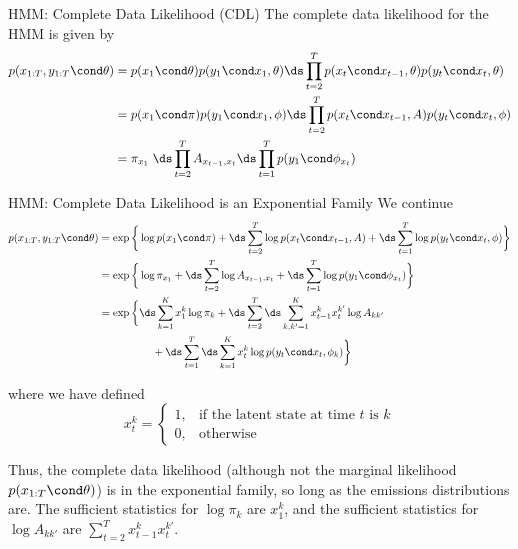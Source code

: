 \documentclass[10pt]{beamer}
\begin{document}
{\begin{frame}{HMM: Complete Data Likelihood (CDL) }
The complete data likelihood for the HMM is given by 
\begin{align}
 p(x_{1:T}, y_{1:T} \cond \theta) &=  p(x_1 \cond \theta)  p(y_1 \cond x_1, \theta) \ds\prod_{t=2}^T p(x_t \cond x_{t-1}, \theta) p(y_t \cond x_t, \theta) \nonumber \\
 &=  p(x_1 \cond \pi) p(y_1 \cond x_1, \phi) \ds\prod_{t=2}^T p(x_t \cond x_{t-1}, A) p(y_t \cond x_t, \phi)   \nonumber \\
 &= \pi_{x_1}  \; \ds\prod_{t=2}^T A_{x_{t-1}, x_t} \ds\prod_{t=1}^T p(y_1 \cond \phi_{x_t}) \label{eqn:hmm_cdl_compact}
 \end{align}
\end{frame}

\begin{frame}{HMM: Complete Data Likelihood is an Exponential Family}
We continue 
\small
\begin{align}
p(x_{1:T}, y_{1:T} \cond \theta) &=  \exp\bigg \{ \log p(x_1 \cond \pi) + \ds\sum_{t=2}^T \log p(x_t \cond x_{t-1}, A) +  \ds\sum_{t=1}^T \log p(y_t \cond x_t, \phi) \bigg\}  \nonumber \\
&= \exp \bigg \{ \log \pi_{x_1}  + \ds\sum_{t=2}^T \log A_{x_{t-1}, x_t} + \ds\sum_{t=1}^T \log p(y_1 \cond \phi_{x_t}) \bigg\} \label{eqn:hmm_cdl_ef_compact} \\
&=  \exp\bigg \{  \ds\sum_{k=1}^K x_1^k \log \pi_k + \ds\sum_{t=2}^T \ds\sum_{k, k'=1}^K x_{t-1}^k x_t^{k'} \log A_{kk'} \nonumber \\ 
&\quad\quad\quad\quad\quad  + \ds\sum_{t=1}^T \ds\sum_{k=1}^K x_t^k \log p(y_t \cond x_t, \phi_k)  \bigg\} \label{eqn:hmm_ef_form}
\end{align}

\tiny where we have defined
\[ x_t^k =  
\begin{cases}	  
1, & \text{if the latent state at time $t$ is $k$} \\
0, & \text{otherwise}
\end{cases} \]

\small

Thus, the complete data likelihood \tiny (although not the marginal  likelihood $p(x_{1:T} \cond \theta)$) \normalsize is in the exponential family, so long as the emissions distributions are.   The sufficient statistics for $\log \pi_k$ are $x_1^k$, and the sufficient statistics for $\log A_{kk'}$ are $\sum_{t=2}^T x_{t-1}^k x_t^{k'}$.

\end{frame}


}
\end{document}

